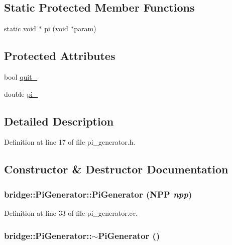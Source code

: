 \subsection*{Static Protected Member Functions}
\begin{DoxyCompactItemize}
\item 
static void $\ast$ \hyperlink{classbridge_1_1_pi_generator_a869dcf4a6fb5598feece0d4d184caf23}{pi} (void $\ast$param)
\end{DoxyCompactItemize}
\subsection*{Protected Attributes}
\begin{DoxyCompactItemize}
\item 
bool \hyperlink{classbridge_1_1_pi_generator_a682f8e27a788cb81f1b862b02e6ab127}{quit\_\-}
\item 
double \hyperlink{classbridge_1_1_pi_generator_a3d35a8b7e364db2572a1e3e983ff5053}{pi\_\-}
\end{DoxyCompactItemize}


\subsection{Detailed Description}


Definition at line 17 of file pi\_\-generator.h.



\subsection{Constructor \& Destructor Documentation}
\hypertarget{classbridge_1_1_pi_generator_a1f76a8c23b9f71c440d8a86e91f9b177}{
\subsubsection[{PiGenerator}]{\setlength{\rightskip}{0pt plus 5cm}bridge::PiGenerator::PiGenerator (NPP {\em npp})}}
\label{classbridge_1_1_pi_generator_a1f76a8c23b9f71c440d8a86e91f9b177}


Definition at line 33 of file pi\_\-generator.cc.

\hypertarget{classbridge_1_1_pi_generator_ae2369ad51a1680d21ff001404a8a84b5}{
\subsubsection[{$\sim$PiGenerator}]{\setlength{\rightskip}{0pt plus 5cm}bridge::PiGenerator::$\sim$PiGenerator ()}}
\label{classbridge_1_1_pi_generator_ae2369ad51a1680d21ff001404a8a84b5}


